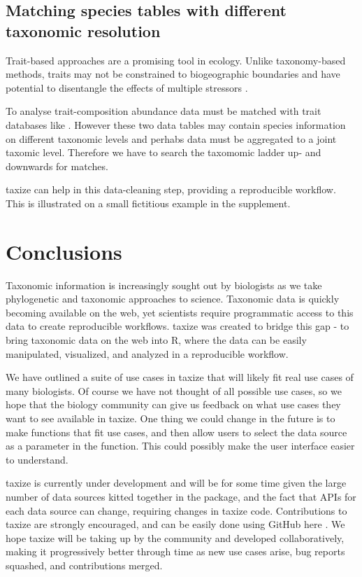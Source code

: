 \documentclass[10pt]{article}\usepackage{graphicx, color}
\begin{document}
\subsection*{Matching species tables with different taxonomic resolution}
Trait-based approaches are a promising tool in ecology. Unlike taxonomy-based methods, traits may not be constrained to biogeographic boundaries \cite{baird_toward_2011} and have potential to disentangle the effects of multiple stressors \cite{statzner_can_2010}. 

To analyse trait-composition abundance data must be matched with trait databases like \cite{usseglio-polatera_biological_2000}. However these two data tables may contain species information on different taxonomic levels and perhabs data must be aggregated to a joint taxomic level. Therefore we have to search the taxomomic ladder up- and downwards for matches.

taxize can help in this data-cleaning step, providing a reproducible workflow. This is illustrated on a small fictitious example in the supplement.


\section*{Conclusions}
Taxonomic information is increasingly sought out by biologists as we take phylogenetic and taxonomic approaches to science. Taxonomic data is quickly becoming available on the web, yet scientists require programmatic access to this data to create reproducible workflows. taxize was created to bridge this gap - to bring taxonomic data on the web into R, where the data can be easily manipulated, visualized, and analyzed in a reproducible workflow.

We have outlined a suite of use cases in taxize that will likely fit real use cases of many biologists. Of course we have not thought of all possible use cases, so we hope that the biology community can give us feedback on what use cases they want to see available in taxize. One thing we could change in the future is to make  functions that fit use cases, and then allow users to select the data source as a parameter in the function. This could possibly make the user interface easier to understand.

taxize is currently under development and will be for some time given the large number of data sources kitted together in the package, and the fact that APIs for each data source can change, requiring changes in taxize code. Contributions to taxize are strongly encouraged, and can be easily done using GitHub here \cite{github_taxize}. We hope taxize will be taking up by the community and developed collaboratively, making it progressively better through time as new use cases arise, bug reports squashed, and contributions merged.
\end{document}
